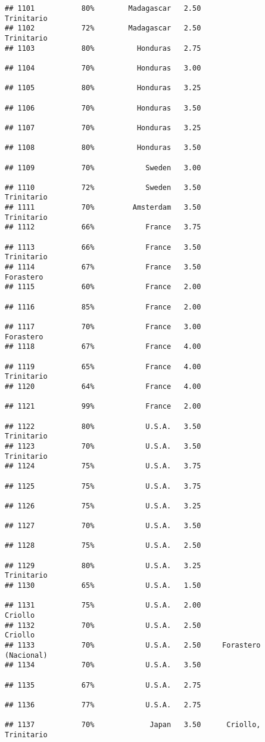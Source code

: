 \documentclass[
]{article}
\begin{document}
\begin{verbatim}
## 1101           80%        Madagascar   2.50               Trinitario
## 1102           72%        Madagascar   2.50               Trinitario
## 1103           80%          Honduras   2.75                         
## 1104           70%          Honduras   3.00                         
## 1105           80%          Honduras   3.25                         
## 1106           70%          Honduras   3.50                         
## 1107           70%          Honduras   3.25                         
## 1108           80%          Honduras   3.50                         
## 1109           70%            Sweden   3.00                         
## 1110           72%            Sweden   3.50               Trinitario
## 1111           70%         Amsterdam   3.50               Trinitario
## 1112           66%            France   3.75                         
## 1113           66%            France   3.50               Trinitario
## 1114           67%            France   3.50                Forastero
## 1115           60%            France   2.00                         
## 1116           85%            France   2.00                         
## 1117           70%            France   3.00                Forastero
## 1118           67%            France   4.00                         
## 1119           65%            France   4.00               Trinitario
## 1120           64%            France   4.00                         
## 1121           99%            France   2.00                         
## 1122           80%            U.S.A.   3.50               Trinitario
## 1123           70%            U.S.A.   3.50               Trinitario
## 1124           75%            U.S.A.   3.75                         
## 1125           75%            U.S.A.   3.75                         
## 1126           75%            U.S.A.   3.25                         
## 1127           70%            U.S.A.   3.50                         
## 1128           75%            U.S.A.   2.50                         
## 1129           80%            U.S.A.   3.25               Trinitario
## 1130           65%            U.S.A.   1.50                         
## 1131           75%            U.S.A.   2.00                  Criollo
## 1132           70%            U.S.A.   2.50                  Criollo
## 1133           70%            U.S.A.   2.50     Forastero (Nacional)
## 1134           70%            U.S.A.   3.50                         
## 1135           67%            U.S.A.   2.75                         
## 1136           77%            U.S.A.   2.75                         
## 1137           70%             Japan   3.50      Criollo, Trinitario

\end{verbatim}
\end{document}
